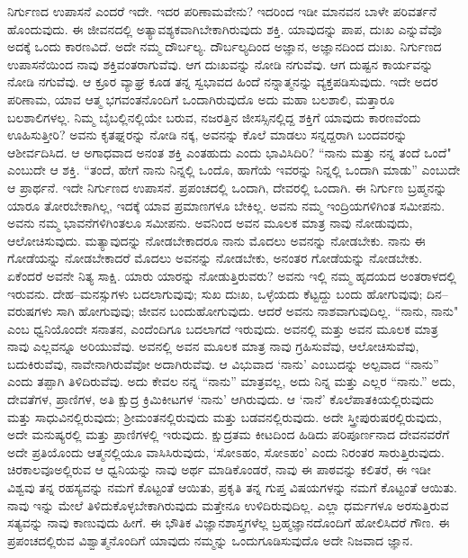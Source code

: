 ನಿರ್ಗುಣದ ಉಪಾಸನೆ ಎಂದರೆ ಇದೇ. ಇದರ ಪರಿಣಾಮವೇನು? ಇದರಿಂದ ಇಡೀ ಮಾನವನ ಬಾಳೇ ಪರಿವರ್ತನೆ ಹೊಂದುವುದು. ಈ ಜೀವನದಲ್ಲಿ ಅತ್ಯಾವಶ್ಯಕವಾಗಿ\break ಬೇಕಾಗಿರುವುದು ಶಕ್ತಿ. ಯಾವುದನ್ನು ಪಾಪ, ದುಃಖ ಎನ್ನುವೆವೊ ಅದಕ್ಕೆ ಒಂದು ಕಾರಣವಿದೆ. ಅದೇ ನಮ್ಮ ದೌರ್ಬಲ್ಯ. ದೌರ್ಬಲ್ಯದಿಂದ ಅಜ್ಞಾನ, ಅಜ್ಞಾನದಿಂದ ದುಃಖ. ನಿರ್ಗುಣದ ಉಪಾಸನೆಯಿಂದ ನಾವು ಶಕ್ತಿವಂತರಾಗುವೆವು. ಆಗ ದುಃಖವನ್ನು ನೋಡಿ ನಗುವೆವು. ಆಗ ದುಷ್ಟನ ಕಾರ್ಯವನ್ನು ನೋಡಿ ನಗುವೆವು. ಆ ಕ್ರೂರ ವ್ಯಾಘ್ರ ಕೂಡ ತನ್ನ ಸ್ವಭಾವದ ಹಿಂದೆ ನನ್ನಾತ್ಮನನ್ನು ವ್ಯಕ್ತಪಡಿಸುವುದು. ಇದೇ ಅದರ ಪರಿಣಾಮ, ಯಾವ ಆತ್ಮ ಭಗವಂತನೊಂದಿಗೆ ಒಂದಾಗಿರುವುದೊ ಅದು ಮಹಾ ಬಲಶಾಲಿ, ಮತ್ತಾರೂ ಬಲಶಾಲಿಗಳಲ್ಲ. ನಿಮ್ಮ ಬೈಬಲ್ಲಿನಲ್ಲಿಯೇ ಬರುವ, ನಜರತ್ತಿನ ಜೀಸಸ್ಸಿನಲ್ಲಿದ್ದ ಶಕ್ತಿಗೆ ಯಾವುದು ಕಾರಣವೆಂದು ಊಹಿಸುತ್ತೀರಿ? ಅವನು ಕೃತಘ್ನರನ್ನು ನೋಡಿ ನಕ್ಕ, ಅವನನ್ನು ಕೊಲೆ ಮಾಡಲು ಸನ್ನದ್ದರಾಗಿ ಬಂದವರನ್ನು ಆಶೀರ್ವದಿಸಿದ. ಆ ಅಗಾಧವಾದ ಅನಂತ ಶಕ್ತಿ ಎಂತಹುದು ಎಂದು ಭಾವಿಸಿದಿರಿ? “ನಾನು ಮತ್ತು ನನ್ನ ತಂದೆ ಒಂದೆ" ಎಂಬುದೇ ಆ ಶಕ್ತಿ. “ತಂದೆ, ಹೇಗೆ ನಾನು ನಿನ್ನಲ್ಲಿ ಒಂದೊ, ಹಾಗೆಯೆ ಇವರನ್ನು ನಿನ್ನಲ್ಲಿ ಒಂದಾಗಿ ಮಾಡು'' ಎಂಬುದೇ ಆ ಪ್ರಾರ್ಥನೆ. ಇದೇ ನಿರ್ಗುಣದ ಉಪಾಸನೆ. ಪ್ರಪಂಚದಲ್ಲಿ ಒಂದಾಗಿ, ದೇವರಲ್ಲಿ ಒಂದಾಗಿ. ಈ ನಿರ್ಗುಣ ಬ್ರಹ್ಮನನ್ನು ಯಾರೂ ತೋರಬೇಕಾಗಿಲ್ಲ, ಇದಕ್ಕೆ ಯಾವ ಪ್ರಮಾಣಗಳೂ ಬೇಕಿಲ್ಲ. ಅವನು ನಮ್ಮ ಇಂದ್ರಿಯಗಳಿಗಿಂತ ಸಮೀಪನು. ಅವನು ನಮ್ಮ ಭಾವನೆಗಳಿಗಿಂತಲೂ ಸಮೀಪನು. ಅವನಿಂದ ಅವನ ಮೂಲಕ ಮಾತ್ರ ನಾವು ನೋಡುವುದು, ಆಲೋಚಿಸುವುದು. ಮತ್ಯಾವುದನ್ನು ನೋಡಬೇಕಾದರೂ ನಾನು ಮೊದಲು ಅವನನ್ನು ನೋಡಬೇಕು. ನಾನು ಈ ಗೋಡೆಯನ್ನು ನೋಡಬೇಕಾದರೆ ಮೊದಲು ಅವನನ್ನು ನೋಡಬೇಕು, ಅನಂತರ ಗೋಡೆಯನ್ನು ನೋಡಬೇಕು. ಏಕೆಂದರೆ ಅವನೇ ನಿತ್ಯ ಸಾಕ್ಷಿ. ಯಾರು ಯಾರನ್ನು ನೋಡುತ್ತಿರುವರು? ಅವನು ಇಲ್ಲಿ ನಮ್ಮ ಹೃದಯದ ಅಂತರಾಳದಲ್ಲಿ ಇರುವನು. ದೇಹ–ಮನಸ್ಸುಗಳು ಬದಲಾಗುವುವು; ಸುಖ ದುಃಖ, ಒಳ್ಳೆಯದು ಕೆಟ್ಟದ್ದು ಬಂದು ಹೋಗುವುವು; ದಿನ–ವರುಷಗಳು ಸಾಗಿ ಹೋಗುವುವು; ಜೀವನ ಬಂದುಹೋಗುವುದು. ಆದರೆ ಅವನು ನಾಶವಾಗುವುದಿಲ್ಲ. “ನಾನು, ನಾನು" ಎಂಬ ಧ್ವನಿಯೊಂದೇ ಸನಾತನ, ಎಂದೆಂದಿಗೂ ಬದಲಾಗದೆ ಇರುವುದು. ಅವನಲ್ಲಿ ಮತ್ತು ಅವನ ಮೂಲಕ ಮಾತ್ರ ನಾವು ಎಲ್ಲವನ್ನೂ ಅರಿಯುವೆವು. ಅವನಲ್ಲಿ ಅವನ ಮೂಲಕ ಮಾತ್ರ ನಾವು ಗ್ರಹಿಸುವೆವು, ಆಲೋಚಿಸುವೆವು, ಬದುಕಿರುವೆವು, ನಾವೇನಾಗಿರುವೆವೋ ಅದಾಗಿರುವೆವು. ಆ ವಿಭುವಾದ `ನಾನು' ಎಂಬುದನ್ನು ಅಲ್ಪವಾದ “ನಾನು'' ಎಂದು ತಪ್ಪಾಗಿ ತಿಳಿದಿರುವೆವು. ಅದು ಕೇವಲ ನನ್ನ “ನಾನು” ಮಾತ್ರವಲ್ಲ, ಅದು ನಿನ್ನ ಮತ್ತು ಎಲ್ಲರ “ನಾನು.” ಅದು, ದೇವತೆಗಳ, ಪ್ರಾಣಿಗಳ, ಅತಿ ಕ್ಷುದ್ರ ಕ್ರಿಮಿಕೀಟಗಳ `ನಾನು' ಆಗಿರುವುದು. ಆ `ನಾನೆ' ಕೊಲೆಪಾತಕಿಯಲ್ಲಿರುವುದು ಮತ್ತು ಸಾಧುವಿನಲ್ಲಿರುವುದು; ಶ‍್ರೀಮಂತನಲ್ಲಿರುವುದು ಮತ್ತು ಬಡವನಲ್ಲಿರುವುದು. ಅದೇ ಸ್ತ್ರೀಪುರುಷರಲ್ಲಿರುವುದು, ಅದೇ ಮನುಷ್ಯರಲ್ಲಿ ಮತ್ತು ಪ್ರಾಣಿಗಳಲ್ಲಿ ಇರುವುದು. ಕ್ಷುದ್ರತಮ ಕೀಟದಿಂದ ಹಿಡಿದು ಪರಿಪೂರ್ಣನಾದ ದೇವನವರೆಗೆ ಅದೇ ಪ್ರತಿಯೊಂದು ಆತ್ಮನಲ್ಲಿಯೂ ವಾಸಿಸಿರುವುದು, `ಸೋಽಹಂ, ಸೋಽಹಂ' ಎಂದು ನಿರಂತರ ಸಾರುತ್ತಿರುವುದು. ಚಿರಕಾಲವೂ\break ಅಲ್ಲಿರುವ ಆ ಧ್ವನಿಯನ್ನು ನಾವು ಅರ್ಥ ಮಾಡಿಕೊಂಡರೆ, ನಾವು ಈ ಪಾಠವನ್ನು ಕಲಿತರೆ, ಈ ಇಡೀ ವಿಶ್ವವು ತನ್ನ ರಹಸ್ಯವನ್ನು ನಮಗೆ ಕೊಟ್ಟಂತೆ ಆಯಿತು, ಪ್ರಕೃತಿ ತನ್ನ ಗುಪ್ತ ವಿಷಯಗಳನ್ನು ನಮಗೆ ಕೊಟ್ಟಂತೆ ಆಯಿತು. ನಾವು ಇನ್ನು ಮೇಲೆ ತಿಳಿದುಕೊಳ್ಳಬೇಕಾಗಿರುವುದು ಮತ್ತೇನೂ ಉಳಿದಿರುವುದಿಲ್ಲ. ಎಲ್ಲಾ ಧರ್ಮಗಳೂ ಅರಸುತ್ತಿರುವ ಸತ್ಯವನ್ನು ನಾವು ಕಾಣುವುದು ಹೀಗೆ. ಈ ಭೌತಿಕ ವಿಜ್ಞಾನಶಾಸ್ತ್ರಗಳೆಲ್ಲ ಬ್ರಹ್ಮಜ್ಞಾನದೊಂದಿಗೆ ಹೋಲಿಸಿದರೆ ಗೌಣ. ಈ ಪ್ರಪಂಚದಲ್ಲಿರುವ ವಿಶ್ವಾತ್ಮನೊಂದಿಗೆ ಯಾವುದು ನಮ್ಮನ್ನು ಒಂದುಗೂಡಿಸುವುದೊ ಅದೇ ನಿಜವಾದ ಜ್ಞಾನ.

